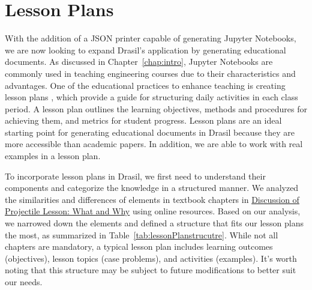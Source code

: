 \chapter{Lesson Plans} \label{chap:lessonplan}
With the addition of a JSON printer capable of generating Jupyter Notebooks, we 
are now looking to expand Drasil's application by generating educational 
documents. As discussed in Chapter~\ref{chap:intro}, Jupyter Notebooks are 
commonly used in teaching engineering courses due to their characteristics and 
advantages. One of the educational practices to enhance teaching is creating 
lesson plans \cite{cicek2013effective, wong2018first}, which provide a 
guide for structuring daily activities in each class period. A lesson plan 
outlines the learning objectives, methods and procedures for achieving them, 
and metrics for student progress. Lesson plans are an ideal starting 
point for generating educational documents in Drasil because they are more 
accessible than academic papers. In addition, we are able to work with real 
examples in a lesson plan. 

To incorporate lesson plans in Drasil, we first need to understand their 
components and categorize the knowledge in a structured manner. We analyzed the 
similarities and differences of elements in textbook chapters in 
\href{https://github.com/smiths/caseStudies/blob/master/CaseStudies/projectile/projectileLesson/AboutProjectileLesson.pdf}{Discussion
 of Projectile Lesson: What and	Why} using online resources. Based on our 
analysis, we narrowed down the elements and defined a structure that fits our 
lesson plans the most, as summarized in Table~\ref{tab:lessonPlanstrucutre}. 
While not all chapters are mandatory, a typical lesson plan includes learning 
outcomes (objectives), lesson topics (case problems), and activities (examples).
It's worth noting that this structure may be subject to future modifications to 
better suit our needs. 

